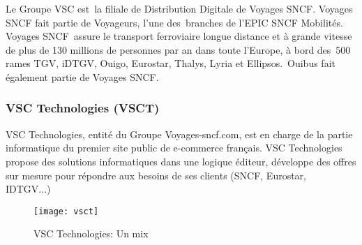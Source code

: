 Le Groupe VSC est la filiale de Distribution Digitale de Voyages SNCF.
Voyages SNCF fait partie de Voyageurs, l'une des branches de l'EPIC SNCF Mobilités. 
Voyages SNCF assure le transport ferroviaire longue distance et à grande vitesse de plus de 130 millions de personnes par an dans toute l’Europe, à bord des 500  rames TGV, iDTGV, Ouigo, Eurostar, Thalys, Lyria et Ellipsos. Ouibus fait également partie de Voyages SNCF.

\subsubsection{VSC Technologies (VSCT)}
VSC Technologies, entité du Groupe Voyages-sncf.com,
est en charge de la partie informatique du premier site public de e-commerce français.
VSC Technologies propose des solutions informatiques dans une logique éditeur,
développe des offres sur mesure pour répondre aux besoins de ses clients (SNCF, Eurostar, IDTGV...) 

\begin{figure}[ht]
 \centering
 \texttt{[image: vsct]}
 \caption{VSC Technologies: Un mix}
 \label{fig:vsct}
\end{figure}

\clearpage
